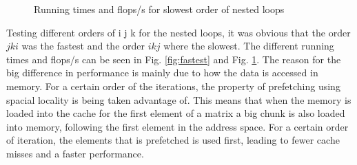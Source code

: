 \begin{figure}[h!] 
 \center 
 \caption{ Running times and flops/s for slowest order of nested loops \label{fig:slowest}}
 \end{figure}


Testing different orders of i j k for the nested loops, it was obvious that the order $j k i$ was the fastest and the order $ i k j$ where the slowest.  The different running times and flops/s can be seen in Fig. \ref{fig:fastest} and Fig. \ref{fig:slowest}. The reason for the big difference in performance is mainly due to how the data is accessed in memory. For a certain order of the iterations, the property of prefetching using spacial locality is being taken advantage of. This means that when the memory is loaded into the cache for the first element of a matrix a big chunk is also loaded into memory, following the first element in the address space. For a certain order of iteration, the elements that is prefetched is used first, leading to fewer cache misses and a faster performance.




